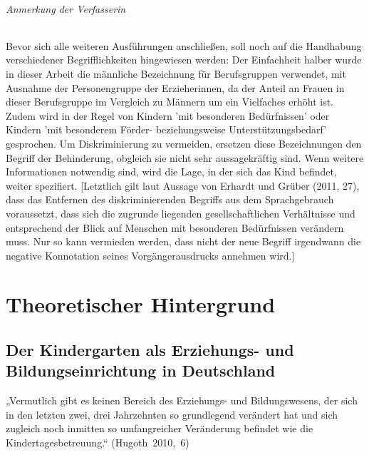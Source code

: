 \paragraph{Anmerkung der Verfasserin}
Bevor sich alle weiteren Ausführungen anschließen, soll noch auf die Handhabung verschiedener Begrifflichkeiten hingewiesen werden: Der Einfachheit halber wurde in dieser Arbeit die männliche Bezeichnung für Berufsgruppen verwendet, mit Ausnahme der Personengruppe der Erzieherinnen, da der Anteil an Frauen in dieser Berufsgruppe im Vergleich zu Männern um ein Vielfaches erhöht ist. 
Zudem wird in der Regel von Kindern 'mit besonderen Bedürfnissen' oder Kindern 'mit besonderem Förder- beziehungsweise Unterstützungsbedarf' gesprochen. Um Diskriminierung zu vermeiden, ersetzen diese Bezeichnungen den Begriff der Behinderung, obgleich sie nicht sehr aussagekräftig sind. Wenn weitere Informationen notwendig sind, wird die Lage, in der sich das Kind befindet, weiter spezifiert. 
[Letztlich gilt laut Aussage von Erhardt und Grüber (2011, 27), dass das Entfernen des diskriminierenden Begriffs aus dem Sprachgebrauch voraussetzt, dass sich die zugrunde liegenden gesellschaftlichen Verhältnisse und entsprechend der Blick auf Menschen mit besonderen Bedürfnissen verändern muss. Nur so kann vermieden werden, dass nicht der neue Begriff irgendwann die negative Konnotation seines Vorgängerausdrucks annehmen wird.] 
  

\part{Theoretischer Hintergrund}
\chapter{Der Kindergarten als Erziehungs- und Bildungseinrichtung in Deutschland}

„Vermutlich gibt es keinen Bereich des Erziehungs- und Bildungswesens, der sich in den letzten zwei, drei Jahrzehnten so grundlegend verändert hat und sich zugleich noch inmitten so umfangreicher Veränderung befindet wie die Kindertagesbetreuung.“ (Hugoth~2010,~6)

